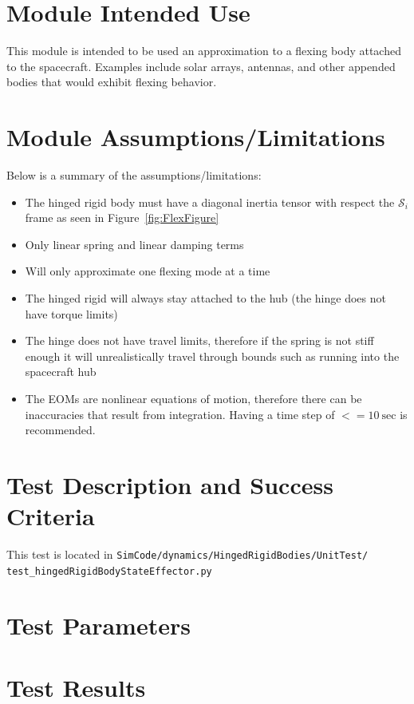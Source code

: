 \documentclass[]{BasiliskReportMemo}
\begin{document}
\section{Module Intended Use}

This module is intended to be used an approximation to a flexing body attached to the spacecraft. Examples include solar arrays, antennas, and other appended bodies that would exhibit flexing behavior. 

\section{Module Assumptions/Limitations}

Below is a summary of the assumptions/limitations:

\begin{itemize}
	\item The hinged rigid body must have a diagonal inertia tensor with respect the $\mathcal{S}_i$ frame as seen in Figure~\ref{fig:FlexFigure}
	\item Only linear spring and linear damping terms
	\item Will only approximate one flexing mode at a time
	\item The hinged rigid will always stay attached to the hub (the hinge does not have torque limits)
	\item The hinge does not have travel limits, therefore if the spring is not stiff enough it will unrealistically travel through bounds such as running into the spacecraft hub
	\item The EOMs are nonlinear equations of motion, therefore there can be inaccuracies that result from integration. Having a time step of $<= 10\ \text{sec}$ is recommended. 
\end{itemize}

\section{Test Description and Success Criteria}

This test is located in \tt SimCode/dynamics/HingedRigidBodies/UnitTest/\newline
test\_hingedRigidBodyStateEffector.py 

\section{Test Parameters}

\section{Test Results}












\end{document}
